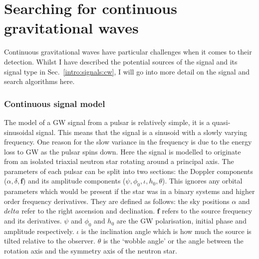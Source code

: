 \chapter{\label{searchcw}Searching for continuous gravitational waves}

Continuous gravitational waves have particular challenges when it comes to their detection.
Whilst I have described the potential sources of the signal and its signal type in Sec.~\ref{intro:signals:cw}, I will go into more detail on the signal and search algorithms here.



\subsection{\label{intro:search:model}Continuous signal model}

The model of a \ac{GW} signal from a pulsar is relatively simple, it is a quasi-sinusoidal signal. This means that the signal is a sinusoid with a slowly varying frequency. One reason for the slow variance in the frequency is due to the energy loss to \ac{GW} as the pulsar spins down.
Here the signal is modelled to originate from an isolated triaxial neutron star rotating around a principal axis. 
The parameters of each pulsar can be split into two sections: the Doppler components ($\alpha,\delta,{\bm f}$) and its amplitude components ($\psi,\phi_0, \iota, h_0, \theta$). This ignores any orbital parameters which would be present if the star was in a binary systems and higher order frequency derivatives.
They are defined as follows: the sky positions $\alpha$ and $delta$ refer to the right ascension and declination. 
${\bm f}$ refers to the source frequency and its derivatives. 
$\psi$ and $\phi_0$ and $h_0 $ are the \ac{GW} polarisation, initial phase and amplitude respectively. 
$\iota$ is the inclination angle which is how much the source is tilted relative to the observer. 
$\theta$ is the `wobble angle' or the angle between the rotation axis and the symmetry axis of the neutron star.

